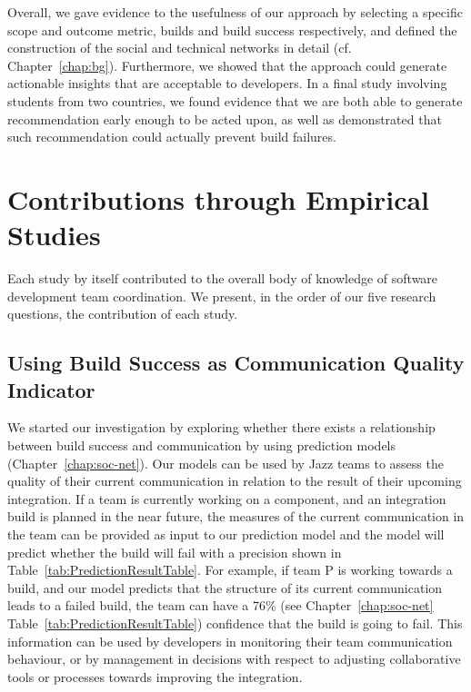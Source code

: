 Overall, we gave evidence to the usefulness of our approach by selecting a specific scope and outcome metric, builds and build success respectively, and defined the construction of the social and technical networks in detail (cf. Chapter~\ref{chap:bg}).
Furthermore, we showed that the approach could generate actionable insights that are acceptable to developers.
In a final study involving students from two countries, we found evidence that we are both able to generate recommendation early enough to be acted upon, as well as demonstrated that such recommendation could actually prevent build failures.



\section{Contributions through Empirical Studies}
\label{sec:cont:emp}
Each study by itself contributed to the overall body of knowledge of software development team coordination.
We present, in the order of our five research questions, the contribution of each  study.


\subsection{Using Build Success as Communication Quality Indicator}
\label{subsec:practicalimpl}
%
We started our investigation by exploring whether there exists a relationship between build success and communication by using prediction models (Chapter~\ref{chap:soc-net}).
Our models can be used by Jazz teams to assess the quality of their current
communication in relation to the result of their upcoming integration. If a team
is currently working on a component, and an integration build is planned in the
near future, the measures of the current communication in the team can be
provided as input to our prediction model and the model will predict whether the
build will fail with a precision shown in Table~\ref{tab:PredictionResultTable}.
For example, if team P is working towards a build, and our model predicts that the
structure of its current communication leads to a failed build, the team can have
a 76\% (see Chapter~\ref{chap:soc-net} Table~\ref{tab:PredictionResultTable}) confidence that the build is
going to fail. This information can be used by developers in monitoring their
team communication behaviour, or by management in decisions with respect to
adjusting collaborative tools or processes towards improving the integration.

